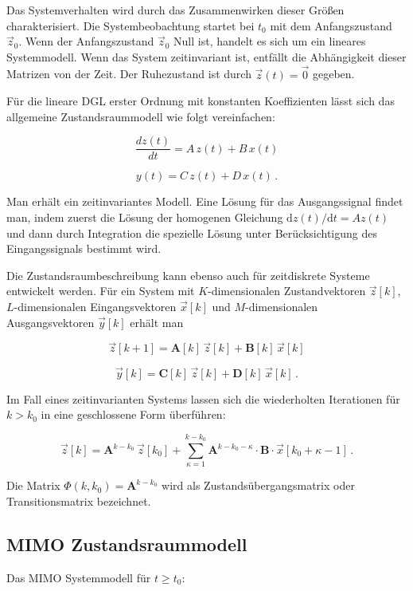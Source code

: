 Das Systemverhalten wird durch das Zusammenwirken dieser Größen charakterisiert. Die Systembeobachtung startet bei $t_0$ mit dem Anfangszustand $\vec{z}_0$. Wenn der Anfangszustand $\vec{z}_0$ Null ist, handelt es sich um ein lineares Systemmodell. Wenn das System zeitinvariant ist, entfällt die Abhängigkeit dieser Matrizen von der Zeit. Der Ruhezustand ist durch $\vec{z}(t) = \vec{0}$ gegeben.

Für die lineare DGL erster Ordnung mit konstanten Koeffizienten lässt sich das allgemeine Zustandsraummodell wie folgt vereinfachen:

$$
\frac{dz(t)}{dt} = A\,z(t) + B\,x(t)
$$

$$
y(t) = C\,z(t) + D\,x(t)\,.
$$

Man erhält ein zeitinvariantes Modell. Eine Lösung für das Ausgangssignal findet man, indem zuerst die Lösung der homogenen Gleichung $\mathrm{d}z(t)/\mathrm{d}t = Az(t)$ und dann durch Integration die spezielle Lösung unter Berücksichtigung des Eingangssignals bestimmt wird.

Die Zustandsraumbeschreibung kann ebenso auch für zeitdiskrete Systeme entwickelt werden. Für ein System mit $K$-dimensionalen Zustandvektoren $\vec{z}[k]$, $L$-dimensionalen Eingangsvektoren $\vec{x}[k]$ und $M$-dimensionalen Ausgangsvektoren $\vec{y}[k]$ erhält man

$$
\vec{z}[k+1] = \mathbf{A}[k]\,\vec{z}[k] + \mathbf{B}[k]\,\vec{x}[k]
$$

$$
\vec{y}[k] = \mathbf{C}[k]\,\vec{z}[k] + \mathbf{D}[k]\,\vec{x}[k]\,.
$$

Im Fall eines zeitinvarianten Systems lassen sich die wiederholten Iterationen für $k > k_0$ in eine geschlossene Form überführen:

$$
\vec{z}[k] = \mathbf{A}^{k-k_0}\,\vec{z}[k_0] + \sum_{\kappa=1}^{k-k_0} \mathbf{A}^{k-k_0-\kappa}\cdot\mathbf{B}\cdot\vec{x}[k_0 + \kappa - 1]\,.
$$

Die Matrix $\Phi(k, k_0) = \mathbf{A}^{k-k_0}$ wird als Zustandsübergangsmatrix oder Transitionsmatrix bezeichnet.

\subsection{MIMO Zustandsraummodell}
\label{sec:mimo-zustandsraum}

Das MIMO Systemmodell für $t \geq t_0$:

